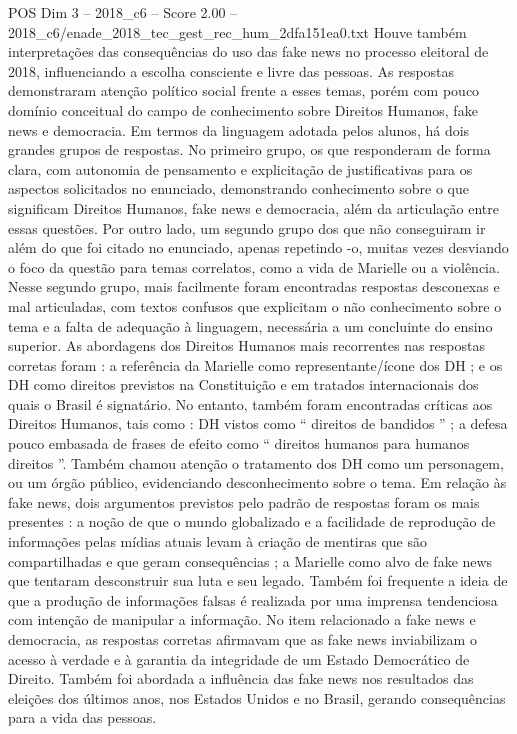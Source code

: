 \begin{textsample}{POS Dim 3 – 2018\_c6 – Score 2.00 – 2018\_c6/enade\_2018\_tec\_gest\_rec\_hum\_2dfa151ea0.txt}
Houve também interpretações das consequências do uso das fake news no processo eleitoral de 2018, influenciando a escolha consciente e livre das pessoas.
As respostas demonstraram atenção político social frente a esses temas, porém com pouco domínio conceitual do campo de conhecimento sobre Direitos Humanos, fake news e democracia.
Em termos da linguagem adotada pelos alunos, há dois grandes grupos de respostas.
No primeiro grupo, os que responderam de forma clara, com autonomia de pensamento e explicitação de justificativas para os aspectos solicitados no enunciado, demonstrando conhecimento sobre o que significam Direitos Humanos, fake news e democracia, além da articulação entre essas questões.
Por outro lado, um segundo grupo dos que não conseguiram ir além do que foi citado no enunciado, apenas repetindo -o, muitas vezes desviando o foco da questão para temas correlatos, como a vida de Marielle ou a violência.
Nesse segundo grupo, mais facilmente foram encontradas respostas desconexas e mal articuladas, com textos confusos que explicitam o não conhecimento sobre o tema e a falta de adequação à linguagem, necessária a um concluinte do ensino superior.
As abordagens dos Direitos Humanos mais recorrentes nas respostas corretas foram : a referência da Marielle como representante/ícone dos DH ; e os DH como direitos previstos na Constituição e em tratados internacionais dos quais o Brasil é signatário.
No entanto, também foram encontradas críticas aos Direitos Humanos, tais como : DH vistos como “ direitos de bandidos ” ; a defesa pouco embasada de frases de efeito como “ direitos humanos para humanos direitos ”.
Também chamou atenção o tratamento dos DH como um personagem, ou um órgão público, evidenciando desconhecimento sobre o tema.
Em relação às fake news, dois argumentos previstos pelo padrão de respostas foram os mais presentes : a noção de que o mundo globalizado e a facilidade de reprodução de informações pelas mídias atuais levam à criação de mentiras que são compartilhadas e que geram consequências ; a Marielle como alvo de fake news que tentaram desconstruir sua luta e seu legado.
Também foi frequente a ideia de que a produção de informações falsas é realizada por uma imprensa tendenciosa com intenção de manipular a informação.
No item relacionado a fake news e democracia, as respostas corretas afirmavam que as fake news inviabilizam o acesso à verdade e à garantia da integridade de um Estado Democrático de Direito.
Também foi abordada a influência das fake news nos resultados das eleições dos últimos anos, nos Estados Unidos e no Brasil, gerando consequências para a vida das pessoas.

\end{textsample}

